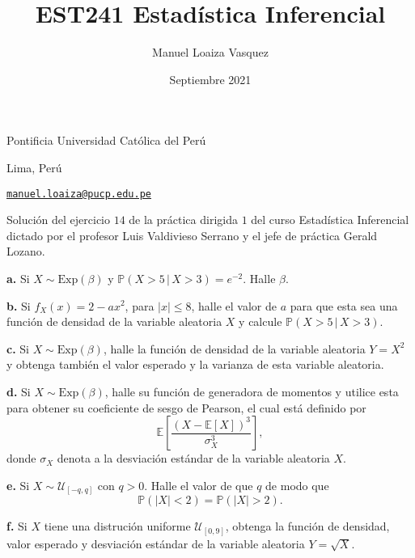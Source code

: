 \documentclass{article}
\title{EST241 Estad\'istica Inferencial}
\author{Manuel Loaiza Vasquez}
\date{Septiembre 2021}
\newenvironment{statement}[1]{\smallskip\noindent\color[rgb]{1.00,0.00,0.50} {\bf #1.}}{}
\theoremstyle{definition}
\theoremstyle{remark}
\begin{document}
\maketitle

\vspace*{-0.25in}
\centerline{Pontificia Universidad Cat\'olica del Per\'u}
\centerline{Lima, Per\'u}
\centerline{\href{mailto:manuel.loaiza@pucp.edu.pe}{{\tt manuel.loaiza@pucp.edu.pe}}}
\vspace*{0.15in}

\begin{framed}
  Soluci\'on del ejercicio $14$ de la pr\'actica dirigida $1$ del curso
  Estad\'istica Inferencial dictado por el profesor Luis Valdivieso Serrano
  y el jefe de pr\'actica Gerald Lozano.
\end{framed}

\begin{statement}{a}
  Si $X \sim \text{Exp}(\beta)$ y $\mathbb{P}(X > 5\, |\, X > 3) = e^{-2}$.
  Halle $\beta$.
\end{statement}

\begin{statement}{b}
  Si $f_X(x) = 2 - a x^2$, para $|x| \leq 8$, halle el valor de $a$ para que esta
  sea una funci\'on de densidad de la variable aleatoria $X$ y calcule
  $\mathbb{P}(X > 5\, |\, X > 3)$.
\end{statement}

\begin{statement}{c}
  Si $X \sim \text{Exp}(\beta)$, halle la funci\'on de densidad de la variable
  aleatoria $Y = X^2$ y obtenga tambi\'en el valor esperado y la varianza
  de esta variable aleatoria.
\end{statement}

\begin{statement}{d}
  Si $X \sim \text{Exp}(\beta)$, halle su funci\'on de generadora de momentos y
  utilice esta para obtener su coeficiente de sesgo de Pearson, el cual est\'a
  definido por
  \[
    \mathbb{E}\left[\frac{(X - \mathbb{E}[X])^3}{\sigma_X^3}\right],
  \]
  donde $\sigma_X$ denota a la desviaci\'on est\'andar de la variable aleatoria $X$.
\end{statement}

\begin{statement}{e}
  Si $X \sim \mathcal{U}_{[-q, q]}$ con $q > 0$. Halle el valor de que $q$ de
  modo que
  \[
    \mathbb{P}(|X| < 2) = \mathbb{P}(|X| > 2).  
  \]
\end{statement}

\begin{statement}{f}
  Si $X$ tiene una distruci\'on uniforme $\mathcal{U}_{[0, 9]}$, obtenga la
  funci\'on de densidad, valor esperado y desviaci\'on est\'andar de la
  variable aleatoria $Y = \sqrt{X}$.
\end{statement}
\end{document}
